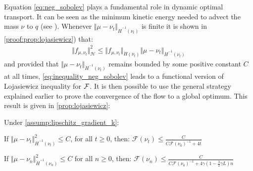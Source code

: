 Equation \cref{eq:neg_sobolev} plays a fundamental role in dynamic optimal transport. %
It can be seen as the minimum kinetic energy needed to advect the mass $\nu$ to $q$ (see \cite{mroueh2018regularized}). Whenever $\Vert \mu - \nu_t \Vert_{\dot{H}^{-1}(\nu_t)} $ is finite it is shown in \cref{proof:prop:lojasiewicz}) that:
\begin{align}\label{eq:inequality_neg_sobolev}
	\Vert f_{\mu,\nu_t} \Vert^2_{\mathcal{H}} \leq \Vert f_{\mu,\nu_t} \Vert_{\dot{H}(\nu_t)} \Vert  \mu -\nu_t\Vert_{\dot{H}^{-1}(\nu_t)}  
\end{align}
and provided that $\Vert \mu - \nu_t \Vert_{\dot{H}^{-1}(\nu_t)} $ remains bounded by some positive constant $C$ at all times, \cref{eq:inequality_neg_sobolev} leads to  a functional version of Lojasiewicz inequality for ${{\mathcal F}}$. 
It is then possible to use the general strategy explained earlier to prove the convergence of the flow to a global optimum. This result is given in \cref{prop:lojasiewicz}:
\begin{proposition}\label{prop:lojasiewicz}
		Under \cref{assump:lipschitz_gradient_k}:
		\begin{proplist}
			\item If $\Vert \mu - \nu_t \Vert^2_{\dot{H}^{-1}(\nu_t)} \leq C$, for all $t\geq 0$, then: $\mathcal{F}(\nu_t)\leq \frac{C}{C\mathcal{F}(\nu_0)^{-1} + 4t}$
			\item If $\Vert \mu - \nu_n \Vert^2_{\dot{H}^{-1}(\nu_n)} \leq C$ for all $n\geq 0$, then: $\mathcal{F}(\nu_n)\leq \frac{C}{C\mathcal{F}(\nu_0)^{-1} + 4\gamma(1-\frac{3}{2}\gamma L) n}$
		\end{proplist}
\end{proposition}
